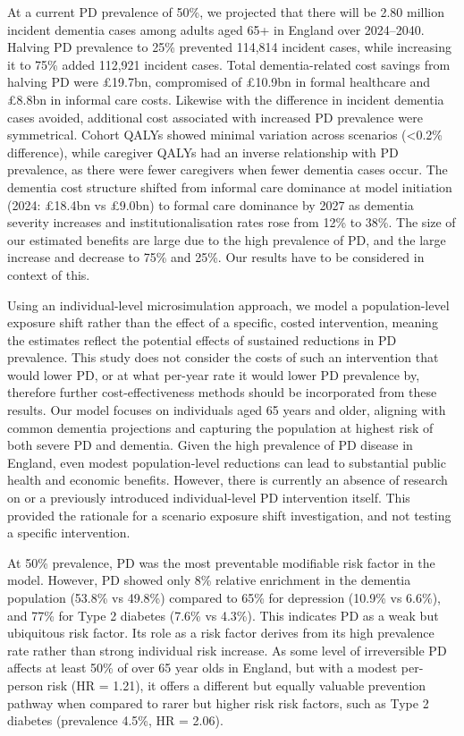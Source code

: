 \documentclass[11pt,a4paper]{article}
\begin{document}
At a current PD prevalence of 50\%, we projected that there will be 2.80 million incident dementia cases among adults aged 65+ in England over 2024--2040. Halving PD prevalence to 25\% prevented 114,814 incident cases, while increasing it to 75\% added 112,921 incident cases. Total dementia-related cost savings from halving PD were \pounds19.7bn, compromised of \pounds10.9bn in formal healthcare and \pounds8.8bn in informal care costs. Likewise with the difference in incident dementia cases avoided, additional cost associated with increased PD prevalence were symmetrical. Cohort QALYs showed minimal variation across scenarios (<0.2\% difference), while caregiver QALYs had an inverse relationship with PD prevalence, as there were fewer caregivers when fewer dementia cases occur. The dementia cost structure shifted from informal care dominance at model initiation (2024: \pounds18.4bn vs \pounds9.0bn) to formal care dominance by 2027 as dementia severity increases and institutionalisation rates rose from 12\% to 38\%. The size of our estimated benefits are large due to the high prevalence of PD, and the large increase and decrease to 75\% and 25\%. Our results have to be considered in context of this.

Using an individual-level microsimulation approach, we model a population-level exposure shift rather than the effect of a specific, costed intervention, meaning the estimates reflect the potential effects of sustained reductions in PD prevalence. This study does not consider the costs of such an intervention that would lower PD, or at what per-year rate it would lower PD prevalence by, therefore further cost-effectiveness methods should be incorporated from these results. Our model focuses on individuals aged 65 years and older, aligning with common dementia projections and capturing the population at highest risk of both severe PD and dementia. Given the high prevalence of PD disease in England, even modest population-level reductions can lead to substantial public health and economic benefits. However, there is currently an absence of research on or a previously introduced individual-level PD intervention itself. This provided the rationale for a scenario exposure shift investigation, and not testing a specific intervention.

At 50\% prevalence, PD was the most preventable modifiable risk factor in the model. However, PD showed only 8\% relative enrichment in the dementia population (53.8\% vs 49.8\%) compared to 65\% for depression (10.9\% vs 6.6\%), and 77\% for Type 2 diabetes (7.6\% vs 4.3\%). This indicates PD as a weak but ubiquitous risk factor. Its role as a risk factor derives from its high prevalence rate rather than strong individual risk increase. As some level of irreversible PD affects at least 50\% of over 65 year olds in England, but with a modest per-person risk (HR = 1.21), it offers a different but equally valuable prevention pathway when compared to rarer but higher risk risk factors, such as Type 2 diabetes (prevalence 4.5\%, HR = 2.06).
\end{document}
